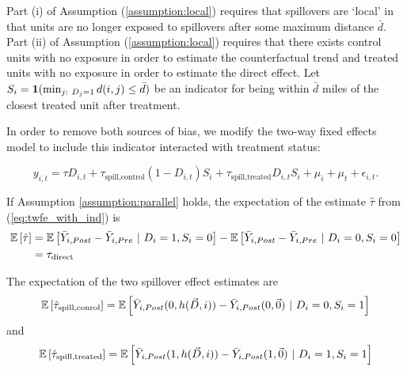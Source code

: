 \documentclass[11pt]{article}
\begin{document}
Part (i) of Assumption (\ref{assumption:local}) requires that spillovers are `local' in that units are no longer exposed to spillovers after some maximum distance $\bar{d}$. Part (ii) of Assumption (\ref{assumption:local}) requires that there exists control units with no exposure in order to estimate the counterfactual trend and treated units with no exposure in order to estimate the direct effect. Let $S_{i}= \mathbf{1}(\min_{j: \ D_j = 1} d(i,j) \leq \bar{d})$ be an indicator for being within $\bar{d}$ miles of the closest treated unit after treatment.

In order to remove both sources of bias, we modify the two-way fixed effects model to include this indicator interacted with treatment status:

\begin{equation}\label{eq:twfe_with_ind}    
    y_{i,t} = \tau D_{i,t} + \tau_{\text{spill,control}} (1-D_{i,t}) S_{i} + \tau_{\text{spill,treated}} D_{i,t} S_{i} +  \mu_i + \mu_t + \epsilon_{i,t}.
\end{equation}

\begin{proposition}\label{thm:remove_bias}
    If Assumption \ref{assumption:parallel} holds, the expectation of the estimate $\hat{\tau}$ from (\ref{eq:twfe_with_ind}) is
    \begin{align*}
        \mathbb{E}\left[\hat{\tau}\right] &= \mathbb{E}\left[\bar{Y}_{i,Post} - \bar{Y}_{i,Pre} \ \vert \ D_i = 1, S_{i} = 0 \right] - \mathbb{E}\left[\bar{Y}_{i,Post} - \bar{Y}_{i,Pre} \ \vert \ D_i = 0, S_{i} = 0 \right] \\ 
        &= \tau_{\text{direct}} 
    \end{align*}

    The expectation of the two spillover effect estimates are 
    \begin{align*}
        \mathbb{E}\left[\hat{\tau}_{\text{spill,conrol}}\right] = \mathbb{E}\left[ \bar{Y}_{i,Post}(0,h(\vec{D}, i)) - \bar{Y}_{i,Post}(0, \vec{0}) \ \vert \ D_i = 0, S_i = 1\right]
    \end{align*}
    and 
    \begin{align*}
        \mathbb{E}\left[\hat{\tau}_{\text{spill,treated}}\right] = \mathbb{E}\left[ \bar{Y}_{i,Post}(1,h(\vec{D}, i)) - \bar{Y}_{i,Post}(1, \vec{0}) \ \vert \ D_i = 1, S_i = 1\right]
    \end{align*}
\end{proposition}
\end{document}
